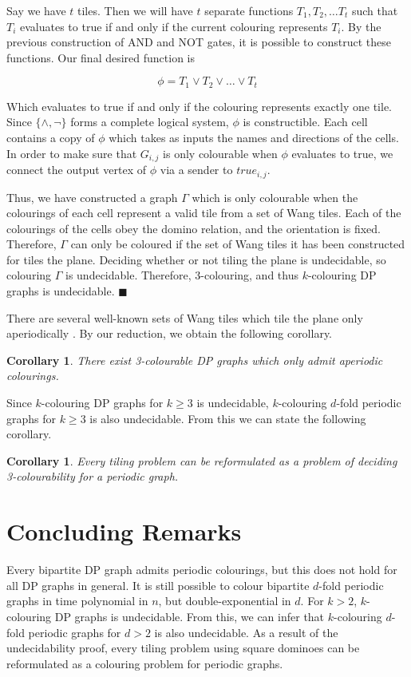 \documentclass[letterpaper]{article}
\newtheorem{corollary}[theorem]{Corollary}
\begin{document}
Say we have $t$ tiles. Then we will have $t$ separate functions $T_1, T_2, \ldots T_t$ such that $T_i$ evaluates to true if and only if the current colouring represents $T_i$. By the previous construction of AND and NOT gates, it is possible to construct these functions. Our final desired function is

\[ \phi = T_1 \vee T_2 \vee \ldots \vee T_t\]

Which evaluates to true if and only if the colouring represents exactly one tile.
Since $\{ \wedge, \neg \}$ forms a complete logical system, $\phi$ is constructible.
Each cell contains a copy of $\phi$ which takes as inputs the names and directions of the cells.
In order to make sure that $G_{i,j}$ is only colourable when $\phi$ evaluates to true, we connect the output vertex of $\phi$ via a sender to \emph{$true_{i,j}$}.

Thus, we have constructed a graph $\Gamma$ which is only colourable when the colourings of each cell represent a valid tile from a set of Wang tiles.
Each of the colourings of the cells obey the domino relation, and the orientation is fixed.
Therefore, $\Gamma$ can only be coloured if the set of Wang tiles it has been constructed for tiles the plane.
Deciding whether or not tiling the plane is undecidable, so colouring $\Gamma$ is undecidable.
Therefore, 3-colouring, and thus $k$-colouring DP graphs is undecidable. $\blacksquare$

There are several well-known sets of Wang tiles which tile the plane only aperiodically \cite{CulikII95}. By our reduction, we obtain the following corollary.

\begin{corollary}
There exist 3-colourable DP graphs which only admit aperiodic colourings.
\end{corollary}

Since $k$-colouring DP graphs for $k \geq 3$ is undecidable, $k$-colouring $d$-fold periodic graphs for $k \geq 3$ is also undecidable.
From this we can state the following corollary.

\begin{corollary}
Every tiling problem can be reformulated as a problem of deciding 3-colourability for a periodic graph.
\end{corollary}

\section{Concluding Remarks}
Every bipartite DP graph admits periodic colourings, but this does not hold for all DP graphs in general.
It is still possible to colour bipartite $d$-fold periodic graphs in time polynomial in $n$, but double-exponential in $d$.
For $k > 2$, $k$-colouring DP graphs is undecidable.
From this, we can infer that $k$-colouring $d$-fold periodic graphs for $d > 2$ is also undecidable.
As a result of the undecidability proof, every tiling problem using square dominoes can be reformulated as a colouring problem for periodic graphs.
\end{document}
